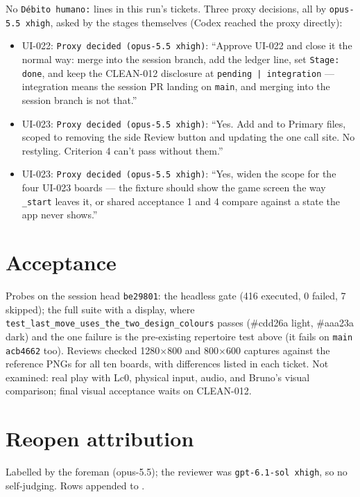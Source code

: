 \documentclass[11pt,a4paper]{article}
\begin{document}
No \texttt{Débito humano:} lines in this run's tickets. Three proxy decisions, all by
\texttt{opus-5.5 xhigh}, asked by the stages themselves (Codex reached the proxy directly):

\begin{itemize}
  \item UI-022: \texttt{Proxy decided (opus-5.5 xhigh)}: ``Approve UI-022 and close it the normal
        way: merge into the session branch, add the ledger line, set \texttt{Stage: done}, and keep
        the CLEAN-012 disclosure at \texttt{pending | integration} — integration means the session
        PR landing on \texttt{main}, and merging into the session branch is not that.''
  \item UI-023: \texttt{Proxy decided (opus-5.5 xhigh)}: ``Yes. Add  and
         to Primary files, scoped to removing the side Review button and
        updating the one call site. No restyling. Criterion 4 can't pass without them.''
  \item UI-023: \texttt{Proxy decided (opus-5.5 xhigh)}: ``Yes, widen the
         scope for the four UI-023 boards — the fixture should show the
        game screen the way \texttt{\_start} leaves it, or shared acceptance 1 and 4 compare against
        a state the app never shows.''
\end{itemize}

\section*{Acceptance}

Probes on the session head \texttt{be29801}: the headless gate (416 executed, 0 failed, 7
skipped); the full suite with a display, where
\texttt{test\_last\_move\_uses\_the\_two\_design\_colours} passes (\#cdd26a light, \#aaa23a dark)
and the one failure is the pre-existing repertoire test above (it fails on \texttt{main}
\texttt{acb4662} too). Reviews checked 1280$\times$800 and 800$\times$600 captures against the
reference PNGs for all ten boards, with differences listed in each ticket. Not examined: real play
with Lc0, physical input, audio, and Bruno's visual comparison; final visual acceptance waits on
CLEAN-012.

\section*{Reopen attribution}

Labelled by the foreman (opus-5.5); the reviewer was \texttt{gpt-6.1-sol xhigh}, so no
self-judging. Rows appended to .
\end{document}
